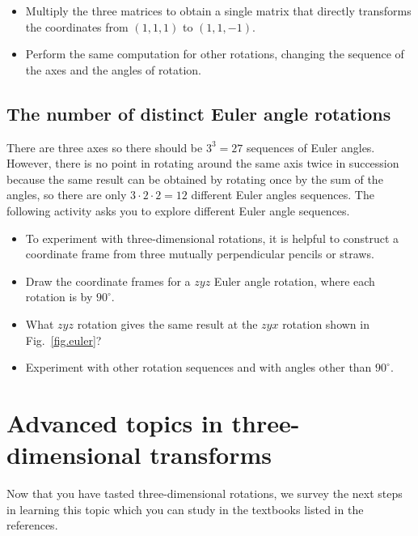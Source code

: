 \begin{framed}
\begin{itemize}
\item Multiply the three matrices to obtain a single matrix that directly transforms the coordinates from $(1,1,1)$ to $(1,1,-1)$.
\item Perform the same computation for other rotations, changing the sequence of the axes and the angles of rotation.
\end{itemize}
\end{framed}

\subsection{The number of distinct Euler angle rotations}

There are three axes so there should be $3^3=27$ sequences of Euler angles. However, there is no point in rotating around the same axis twice in succession because the same result can be obtained by rotating once by the sum of the angles, so there are only $3\cdot 2\cdot 2=12$ different Euler angles sequences.  The following activity asks you to explore different Euler angle sequences.

\begin{framed}
\begin{itemize}
\item To experiment with three-dimensional rotations, it is helpful to construct a coordinate frame from three mutually perpendicular pencils or straws.
\item Draw the coordinate frames for a $zyz$ Euler angle rotation, where each rotation is by $90^\circ$. %
\item What $zyz$ rotation gives the same result at the $zyx$ rotation shown in Fig.~\ref{fig.euler}? %
\item Experiment with other rotation sequences and with angles other than $90^\circ$.
\end{itemize}
\end{framed}

\section{Advanced topics in three-dimensional transforms}\label{s.advanced-three}

Now that you have tasted three-dimensional rotations, we survey the next steps in learning this topic which you can study in the textbooks listed in the references.


